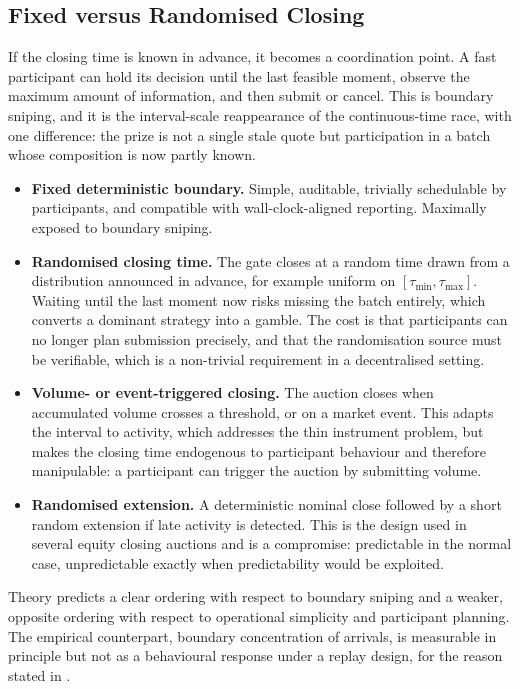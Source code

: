 \subsection{Fixed versus Randomised Closing}

If the closing time is known in advance, it becomes a coordination
point. A fast participant can hold its decision until the last feasible
moment, observe the maximum amount of information, and then submit or
cancel. This is boundary sniping, and it is the interval-scale
reappearance of the continuous-time race, with one difference: the
prize is not a single stale quote but participation in a batch whose
composition is now partly known.

\begin{itemize}
  \item \textbf{Fixed deterministic boundary.} Simple, auditable,
  trivially schedulable by participants, and compatible with
  wall-clock-aligned reporting. Maximally exposed to boundary sniping.
  \item \textbf{Randomised closing time.} The gate closes at a random
  time drawn from a distribution announced in advance, for example
  uniform on $[\tau_{\min}, \tau_{\max}]$. Waiting until the last
  moment now risks missing the batch entirely, which converts a
  dominant strategy into a gamble. The cost is that participants can no
  longer plan submission precisely, and that the randomisation source
  must be verifiable, which is a non-trivial requirement in a
  decentralised setting.
  \item \textbf{Volume- or event-triggered closing.} The auction closes
  when accumulated volume crosses a threshold, or on a market event.
  This adapts the interval to activity, which addresses the thin
  instrument problem, but makes the closing time endogenous to
  participant behaviour and therefore manipulable: a participant can
  trigger the auction by submitting volume.
  \item \textbf{Randomised extension.} A deterministic nominal close
  followed by a short random extension if late activity is detected.
  This is the design used in several equity closing auctions and is a
  compromise: predictable in the normal case, unpredictable exactly when
  predictability would be exploited.
\end{itemize}

Theory predicts a clear ordering with respect to boundary sniping and a
weaker, opposite ordering with respect to operational simplicity and
participant planning. The empirical counterpart, boundary concentration
of arrivals, is measurable in principle but not as a behavioural
response under a replay design, for the reason stated in
.

